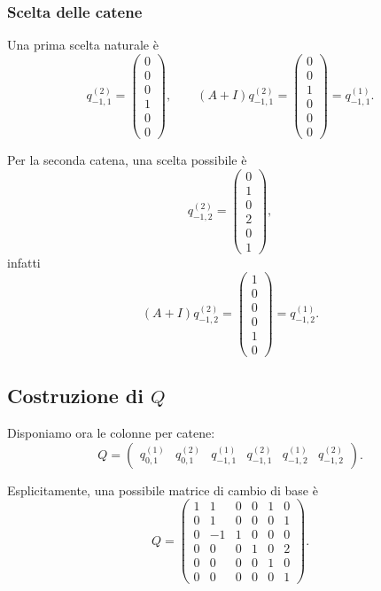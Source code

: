 \subsubsection*{Scelta delle catene}

Una prima scelta naturale è
\[
q_{-1,1}^{(2)}=
\begin{pmatrix}
0\\
0\\
0\\
1\\
0\\
0
\end{pmatrix},
\qquad
(A+I)q_{-1,1}^{(2)}=
\begin{pmatrix}
0\\
0\\
1\\
0\\
0\\
0
\end{pmatrix}
=q_{-1,1}^{(1)}.
\]

Per la seconda catena, una scelta possibile è
\[
q_{-1,2}^{(2)}=
\begin{pmatrix}
0\\
1\\
0\\
2\\
0\\
1
\end{pmatrix},
\]
infatti
\[
(A+I)q_{-1,2}^{(2)}=
\begin{pmatrix}
1\\
0\\
0\\
0\\
1\\
0
\end{pmatrix}
=q_{-1,2}^{(1)}.
\]

\subsection{Costruzione di \texorpdfstring{$Q$}{Q}}

Disponiamo ora le colonne per catene:
\[
Q=
\begin{pmatrix}
q_{0,1}^{(1)} & q_{0,1}^{(2)} &
q_{-1,1}^{(1)} & q_{-1,1}^{(2)} &
q_{-1,2}^{(1)} & q_{-1,2}^{(2)}
\end{pmatrix}.
\]

Esplicitamente, una possibile matrice di cambio di base è
\begin{equation}
Q=
\begin{pmatrix}
1 & 1 & 0 & 0 & 1 & 0\\
0 & 1 & 0 & 0 & 0 & 1\\
0 & -1 & 1 & 0 & 0 & 0\\
0 & 0 & 0 & 1 & 0 & 2\\
0 & 0 & 0 & 0 & 1 & 0\\
0 & 0 & 0 & 0 & 0 & 1
\end{pmatrix}.
\label{eq:L7_example_Q}
\end{equation}

